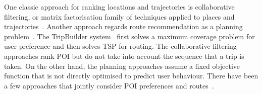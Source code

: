 One classic approach for ranking locations and trajectories is collaborative filtering, 
or matrix factorisation family of techniques applied to places and trajectories~\cite{shi2011personalized,zhang2015location,ijcai13}.
Another approach regards route recommendation as a planning problem~\cite{gioniswsdm14,ijcai15}.
The TripBuilder system~\cite{brilhante2013shall} first solves a maximum coverage problem for user preference and then solves TSP for routing. 
The collaborative filtering approaches rank POI but do not take into account the sequence that a trip is taken. 
On the other hand, the planning approaches assume a fixed objective function that is not directly optimised to predict user behaviour. 
There have been a few approaches that jointly consider POI preferences and routes~\cite{chen2015tripplanner,kurashima2010geotag,kurashima2010geotag,cikm16paper}.



%

